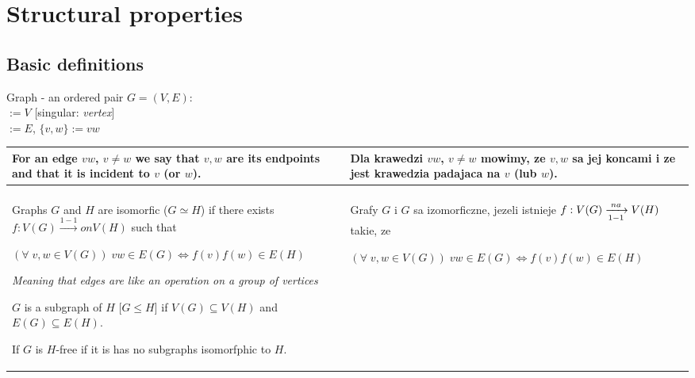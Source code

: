 \section{Structural properties}

\subsection{Basic definitions}

\pdef

    {\color{def}Graph} - an ordered pair $G=(V,E)$:\smallskip\\
     $:=V$ [singular: \emph{vertex}]\\
     $:=E$, $\{v,w\}:=vw$

\kdef 

\begin{tabularx}{\textwidth}{ X!{\color{git90gray}\vrule} X }

    For an edge $vw$, $v\neq w$ we say that $v,w$ are its {\color{acc}endpoints} and that it is {\color{acc}incident} to $v$ (or $w$). 
    \medskip

    &
    Dla krawedzi $vw$, $v\neq w$ mowimy, ze $v,w$ sa jej {\color{acc}koncami} i ze jest krawedzia {\color{acc}padajaca} na $v$ (lub $w$).
    \medskip

    \\

    \hline

    & \\

    Graphs $G$ and $H$ are {\color{def}isomorfic} ($G\simeq H$) if there exists $f:V(G)\xrightarrow{1-1}{on} V(H)$ such that
    
    $(\forall\;v,w\in V(G))\;vw\in E(G)\iff f(v)f(w)\in E(H)$
    \smallskip

    \emph{\color{dyg}Meaning that edges are like an operation on a group of vertices}
    \medskip

    $G$ is a {\color{def}subgraph} of $H$ [$G\leq H$] if $V(G)\subseteq V(H)$ and $E(G)\subseteq E(H)$.
    \medskip

    If $G$ is {\color{def}$H$-free} if it is has no subgraphs isomorfphic to $H$.
    \medskip

    &
    Grafy $G$ i $G$ sa {\color{def}izomorficzne}, jezeli istnieje $f:V(G)\xrightarrow[1-1]{na}V(H)$ takie, ze

    $(\forall\;v,w\in V(G))\;vw\in E(G)\iff f(v)f(w)\in E(H)$
    \medskip


\end{tabularx}
